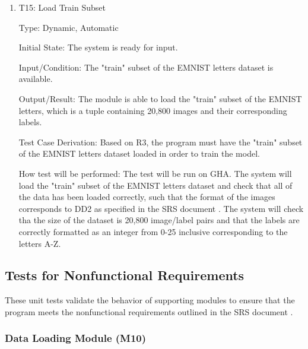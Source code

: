 \documentclass[12pt, titlepage]{article}
\begin{document}
\begin{enumerate}

\item{T15: Load Train Subset\\}

Type: Dynamic, Automatic

Initial State: The \progname{} system is ready for input.

Input/Condition: The "train" subset of the EMNIST letters dataset is available.

Output/Result: The module is able to load the "train" subset of the EMNIST
letters, which is a tuple containing 20,800 images and their corresponding
labels.

Test Case Derivation: Based on R3, the program must have the "train" subset
of the EMNIST letters dataset loaded in order to train the model.

How test will be performed: The test will be run on GHA. The system will load the
"train" subset of the EMNIST letters dataset and check that all of the
data has been loaded correctly, such that the format of the images corresponds
to DD2 as specified in the SRS document \citep{SRS}. The system will check tha
the size of the dataset is 20,800 image/label pairs and that the labels are
correctly formatted as an integer from 0-25 inclusive corresponding to the
letters A-Z.

\end{enumerate}

\subsection{Tests for Nonfunctional Requirements}

These unit tests validate the behavior of supporting modules to ensure that the
\progname{} program meets the nonfunctional requirements outlined in the SRS
document \citep{SRS}.




\subsubsection{Data Loading Module (M10)}
\end{document}
